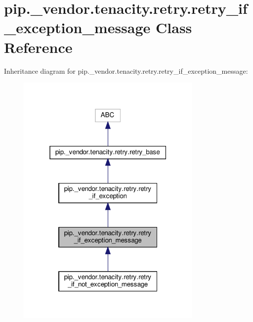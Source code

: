\hypertarget{classpip_1_1__vendor_1_1tenacity_1_1retry_1_1retry__if__exception__message}{}\section{pip.\+\_\+vendor.\+tenacity.\+retry.\+retry\+\_\+if\+\_\+exception\+\_\+message Class Reference}
\label{classpip_1_1__vendor_1_1tenacity_1_1retry_1_1retry__if__exception__message}


Inheritance diagram for pip.\+\_\+vendor.\+tenacity.\+retry.\+retry\+\_\+if\+\_\+exception\+\_\+message\+:
\nopagebreak
\begin{figure}[H]
\begin{center}
\leavevmode
\includegraphics[width=256pt]{classpip_1_1__vendor_1_1tenacity_1_1retry_1_1retry__if__exception__message__inherit__graph}
\end{center}
\end{figure}


